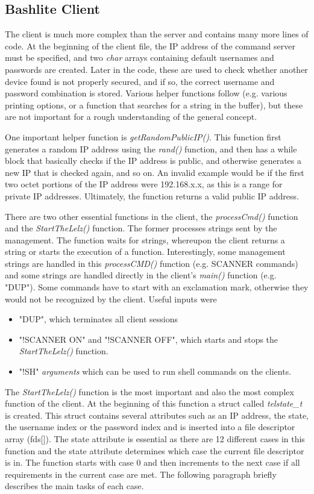 \subsection{Bashlite Client}
The client is much more complex than the server and contains many more lines of code. At the beginning of the client file, the IP address of the command server must be specified, and two \textit{char} arrays containing default usernames and passwords are created. Later in the code, these are used to check whether another device found is not properly secured, and if so, the correct username and password combination is stored.
Various helper functions follow (e.g. various printing options, or a function that searches for a string in the buffer), but these are not important for a rough understanding of the general concept. 

One important helper function is \textit{getRandomPublicIP()}. This function first generates a random IP address using the \textit{rand()} function, and then has a while block that basically checks if the IP address is public, and otherwise generates a new IP that is checked again, and so on. An invalid example would be if the first two octet portions of the IP address were 192.168.x.x, as this is a range for private IP addresses. Ultimately, the function returns a valid public IP address.

There are two other essential functions in the client, the \textit{processCmd()} function and the \textit{StartTheLelz()} function. The former processes strings sent by the management. The function waits for strings, whereupon the client returns a string or starts the execution of a function. Interestingly, some management strings are handled in this \textit{processCMD()} function (e.g. SCANNER commands) and some strings are handled directly in the client's \textit{main()} function (e.g. "DUP"). Some commands have to start with an exclamation mark, otherwise they would not be recognized by the client. Useful inputs were
\begin{itemize}
    \item "DUP", which terminates all client sessions
\item "!SCANNER ON" and "!SCANNER OFF", which starts and stops the \textit{StartTheLelz()} function.
    \item "!SH" \textit{arguments} which can be used to run shell commands on the clients. 
\end{itemize}

The \textit{StartTheLelz()} function is the most important and also the most complex function of the client. At the beginning of this function a struct called \textit{telstate\_t} is created. This struct contains several attributes such as an IP address, the state, the username index or the password index and is inserted into a file descriptor array (fds[]). The state attribute is essential as there are 12 different cases in this function and the state attribute determines which case the current file descriptor is in. The function starts with case 0 and then increments to the next case if all requirements in the current case are met. The following paragraph briefly describes the main tasks of each case. 

